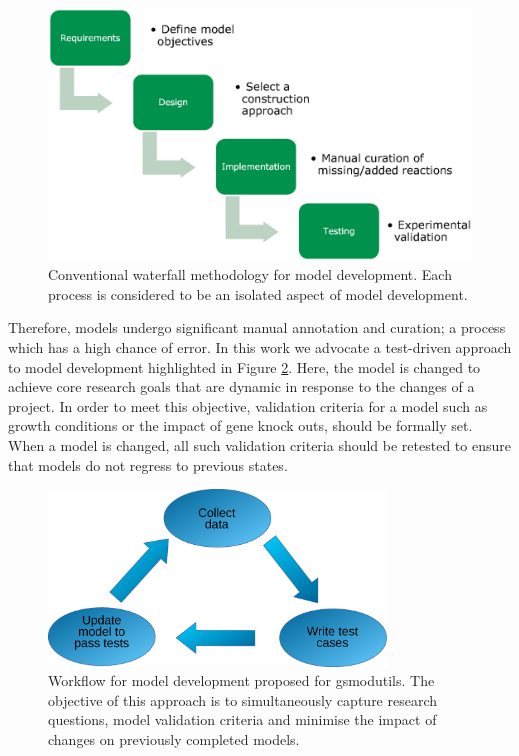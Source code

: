 \documentclass[journal=asbcd6,10pt]{achemso}
\begin{document}
\begin{figure}[ht]
\includegraphics[width=\textwidth]{waterfall.eps}
\caption{Conventional waterfall methodology for model development.
Each process is considered to be an isolated aspect of model development.}
\label{fig:methodology_approaches}
\end{figure}

Therefore, models undergo significant manual annotation and curation; a process which has a high chance of error.
In this work we advocate a test-driven approach to model development highlighted in Figure \ref{fig:test_driven}.
Here, the model is changed to achieve core research goals that are dynamic in response to the changes of a project.
In order to meet this objective, validation criteria for a model such as growth conditions or the impact of gene knock outs, should be formally set.
When a model is changed, all such validation criteria should be retested to ensure that models do not regress to previous states.

\begin{figure}[ht]
\centering
\includegraphics[width=0.8\textwidth]{testdriven.eps}
\caption{Workflow for model development proposed for gsmodutils.
The objective of this approach is to simultaneously capture research questions, model validation criteria and minimise the impact of changes on previously completed models.
}
\label{fig:test_driven}
\end{figure}
\end{document}
